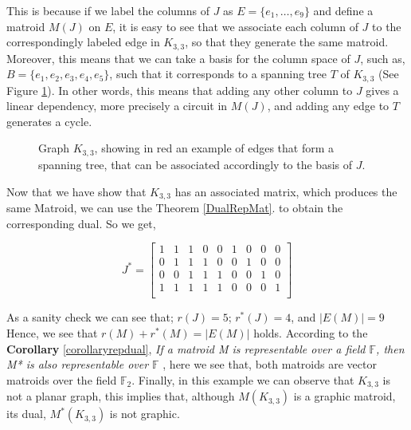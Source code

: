 This is because if we label the columns of $J$ as $E = \{e_1,\dots, e_9\}$ and define a matroid $M(J)$ on $E$, it is easy to see that we associate each column of $J$ to the correspondingly labeled edge in $K_{3,3}$, so that they generate the same matroid. Moreover, this means that we can take a basis for the column space of $J$, such as, $B = \{e_1, e_2, e_3, e_4, e_5\}$, such that it corresponds to a spanning tree $T$ of $K_{3,3}$ (See Figure \ref{K33STE}). In other words, this means that adding any other column to $J$ gives a linear dependency, more precisely a circuit in $M(J)$, and adding any edge to $T$ generates a cycle.

\begin{figure}[H]
    \centering
    \caption{Graph $K_{3,3}$, showing in red an example of edges that form a spanning tree, that can be associated accordingly to the basis of $J$.}
    \label{K33STE}
\end{figure}

Now that we have show that $K_{3,3}$ has an associated matrix, which produces the same Matroid, we can use the Theorem \ref{DualRepMat}. to obtain the corresponding dual. 
So we get, 
\begin{figure}[H]
  $$J^*=\begin{bmatrix} 
1 & 1 & 1 & 0 & 0 & 1 & 0 & 0 & 0\\
0 & 1 & 1 & 1 & 0 & 0 & 1 & 0 & 0\\
0 & 0 & 1 & 1 & 1 & 0 & 0 & 1 & 0\\
1 & 1 & 1 & 1 & 1 & 0 & 0 & 0 & 1\\
\end{bmatrix}$$
\end{figure}

As a sanity check we can see that;
$r(J) = 5$;  $r^*(J)=4$, and $|E(M)|=9$
Hence, we see that $r(M) + r^*(M) = |E(M)|$ holds.
According to the \textbf{Corollary} \ref{corollaryrepdual}, \textit{If a matroid \textit{M} is \textit{representable} over a field $\mathbb{F}$, then \textit{M*} is also representable over $\mathbb{F}$} , here we see that, both matroids are vector matroids over the field $\mathbb{F}_2$. 
Finally, in this example we can observe that $K_{3,3}$ is not a planar graph, this implies that, although $M(K_{3,3})$ is a graphic matroid, its dual, $M^*(K_{3,3})$ is not graphic.

